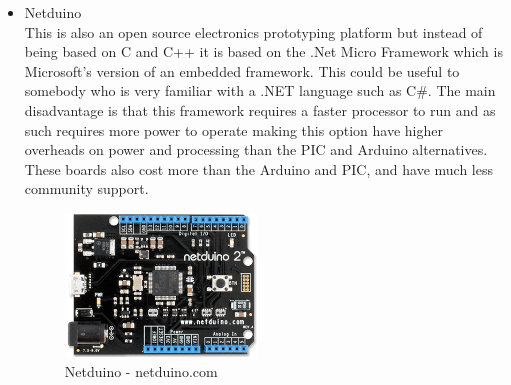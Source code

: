 \begin{itemize}
\item Netduino
\\This is also an open source electronics prototyping platform but instead of being based on C and C++ it is based on the .Net Micro Framework which is Microsoft's version of an embedded framework.  This could be useful to somebody who is very familiar with a .NET language such as C\#.  The main disadvantage is that this framework requires a faster processor to run and as such requires more power to operate making this option have higher overheads on power and processing than the PIC and Arduino alternatives.
\\These boards also cost more than the Arduino and PIC, and have much less community support.
\begin{figure}[h]
\centering
        \includegraphics[width=2.0in] {Images/netduino.png}
        \caption{Netduino - netduino.com}
        \label{Netduino}
\end{figure}


\end{itemize}
